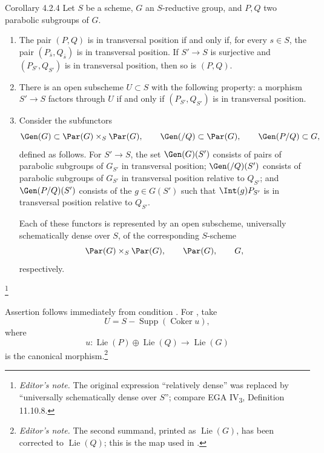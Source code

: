 \begin{sgastatement}{Corollary 4.2.4}
Let \(S\) be a scheme, \(G\) an \(S\)-reductive group, and \(P,Q\) two
parabolic subgroups of \(G\).
\begin{enumerate}[label=\textup{(\roman*)}]
\item The pair \((P,Q)\) is in transversal position if and only if, for
every \(s\in S\), the pair \((P_{\bar s},Q_{\bar s})\) is in transversal
position.  If \(S'\to S\) is surjective and
\((P_{S'},Q_{S'})\) is in transversal position, then so is \((P,Q)\).
\item There is an open subscheme \(U\subset S\) with the following
property: a morphism \(S'\to S\) factors through \(U\) if and only if
\((P_{S'},Q_{S'})\) is in transversal position.
\item Consider the subfunctors
\[
 \Gen(G)\subset\Par(G)\times_S\Par(G),\qquad
 \Gen(/Q)\subset\Par(G),\qquad
 \Gen(P/Q)\subset G,
\]
defined as follows.  For \(S'\to S\), the set \(\Gen(G)(S')\) consists
of pairs of parabolic subgroups of \(G_{S'}\) in transversal position;
\(\Gen(/Q)(S')\) consists of parabolic subgroups of \(G_{S'}\) in
transversal position relative to \(Q_{S'}\); and \(\Gen(P/Q)(S')\)
consists of the \(g\in G(S')\) such that \(\Int(g)P_{S'}\) is in
transversal position relative to \(Q_{S'}\).

Each of these functors is represented by an open subscheme,
universally schematically dense over \(S\), of the corresponding
\(S\)-scheme
\[
 \Par(G)\times_S\Par(G),\qquad\Par(G),\qquad G,
\]
respectively.
\end{enumerate}
\end{sgastatement}
\footnote{\emph{Editor's note.} The original expression ``relatively
dense'' was replaced by ``universally schematically dense over \(S\)'';
compare EGA IV\textsubscript{3}, Definition 11.10.8.}

Assertion \textup{} follows immediately from condition
\textup{}.  For \textup{}, take
\[
 U=S-\operatorname{Supp}(\operatorname{Coker}u),
\]
where
\[
 u:\operatorname{Lie}(P)\oplus\operatorname{Lie}(Q)
   \longrightarrow\operatorname{Lie}(G)
\]
is the canonical morphism.\footnote{\emph{Editor's note.} The second
summand, printed as \(\operatorname{Lie}(G)\), has been corrected to
\(\operatorname{Lie}(Q)\); this is the map used in \textup{}.}

